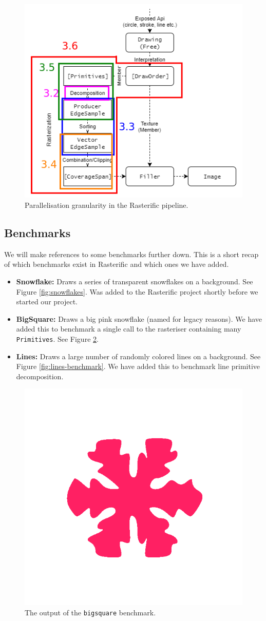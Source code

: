 \documentclass[12pt, a4paper]{article}
\begin{document}
\begin{figure}[H]
  \centering
  \includegraphics[width=.6\linewidth]{../rasterific-pipeline-flot}
  \caption{Parallelisation granularity in the Rasterific pipeline.}
  \label{fig:rasterific-pipeline-flot}
\end{figure}


\subsection{Benchmarks}
We will make references to some benchmarks further down. This is a short recap of which benchmarks exist in Rasterific and which ones we have added.
\begin{itemize}
\item \textbf{Snowflake:} Draws a series of transparent snowflakes on a background. See Figure \ref{fig:snowflakes}. Was added to the Rasterific project
   shortly before we started our project.
\item \textbf{BigSquare:} Draws a big pink snowflake (named for legacy reasons). We have added this to benchmark a single call to the rasteriser containing many \texttt{Primitives}. See Figure \ref{fig:bigsquare-benchmark}.
\item \textbf{Lines:} Draws a large number of randomly colored lines on a background. See Figure \ref{fig:lines-benchmark}.
  We have added this to benchmark line primitive decomposition.
\end{itemize}
\begin{figure}[h!]
  \centering
  \includegraphics[width=.2\linewidth]{../bigsquare}
  \caption{The output of the \texttt{bigsquare} benchmark.}
  \label{fig:bigsquare-benchmark}
\end{figure}
\end{document}

